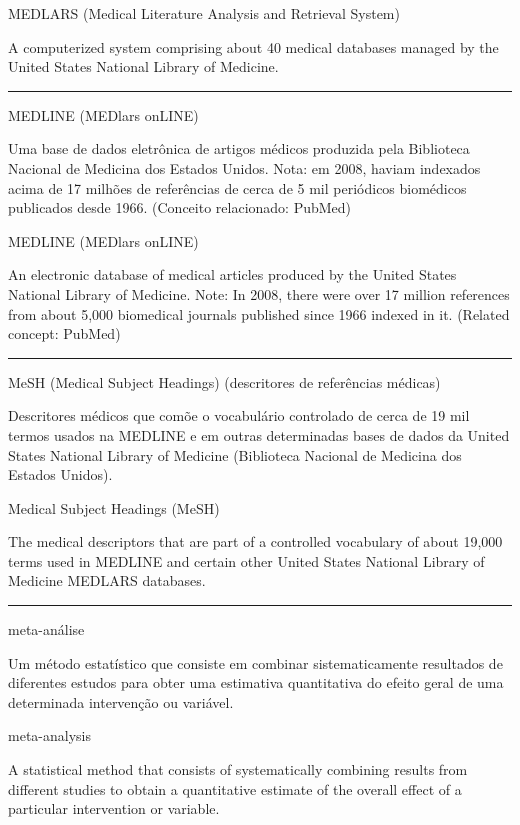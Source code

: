 \documentclass[
  openany]{book}
\begin{document}
MEDLARS (Medical Literature Analysis and Retrieval System)

A computerized system comprising about 40 medical databases managed by the United States National Library of Medicine.

\begin{center}\rule{0.5\linewidth}{0.5pt}\end{center}

MEDLINE (MEDlars onLINE)

Uma base de dados eletrônica de artigos médicos produzida pela Biblioteca Nacional de Medicina dos Estados Unidos. Nota: em 2008, haviam indexados acima de 17 milhões de referências de cerca de 5 mil periódicos biomédicos publicados desde 1966. (Conceito relacionado: PubMed)

MEDLINE (MEDlars onLINE)

An electronic database of medical articles produced by the United States National Library of Medicine. Note: In 2008, there were over 17 million references from about 5,000 biomedical journals published since 1966 indexed in it. (Related concept: PubMed)

\begin{center}\rule{0.5\linewidth}{0.5pt}\end{center}

MeSH (Medical Subject Headings) (descritores de referências médicas)

Descritores médicos que comõe o vocabulário controlado de cerca de 19 mil termos usados na MEDLINE e em outras determinadas bases de dados da United States National Library of Medicine (Biblioteca Nacional de Medicina dos Estados Unidos).

Medical Subject Headings (MeSH)

The medical descriptors that are part of a controlled vocabulary of about 19,000 terms used in MEDLINE and certain other United States National Library of Medicine MEDLARS databases.

\begin{center}\rule{0.5\linewidth}{0.5pt}\end{center}

meta-análise

Um método estatístico que consiste em combinar sistematicamente resultados de diferentes estudos para obter uma estimativa quantitativa do efeito geral de uma determinada intervenção ou variável.

meta-analysis

A statistical method that consists of systematically combining results from different studies to obtain a quantitative estimate of the overall effect of a particular intervention or variable.
\end{document}
